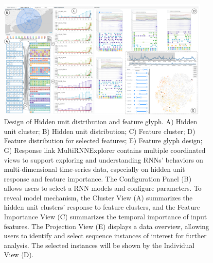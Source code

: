 \begin{figure}[t]
	\centering
	\includegraphics[width=0.95\textwidth]{figure/MultiRNNExplorer/teaser.pdf}
	\vspace{-3mm}
	\caption{Design of Hidden unit distribution and feature glyph. A) Hidden unit cluster; B) Hidden unit distribution; C) Feature cluster; D) Feature distribution for selected features; E) Feature glyph design; G) Response link MultiRNNExplorer contains multiple coordinated views to support exploring and understanding RNNs' behaviors on multi-dimensional time-series data, especially on hidden unit response and feature importance.
		The Configuration Panel (B) allows users to select a RNN models and configure parameters. 
		To reveal model mechanism, the Cluster View (A) summarizes the hidden unit clusters' response to feature clusters, and the Feature Importance View (C) summarizes the temporal importance of input features. 
		The Projection View (E) displays a data overview, allowing users to identify and select sequence instances of interest for further analysis. 
		The selected instances will be shown by the Individual View (D). }
	\label{fig:teaser}
	\vspace{-4mm}
\end{figure}





